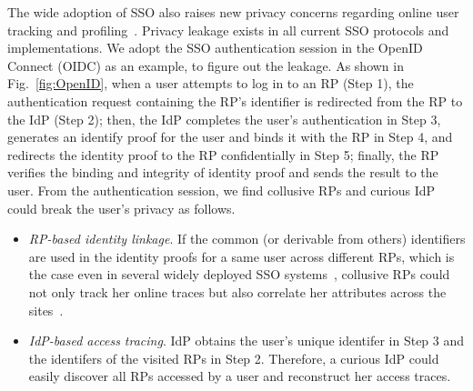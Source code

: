 The wide adoption of SSO also raises new privacy concerns regarding online user tracking and profiling~\cite{maler2008venn,NIST2017draft}.
Privacy leakage exists in all current SSO protocols and implementations.
We adopt the SSO authentication session in the OpenID Connect (OIDC)  as an example, to figure out the leakage. %
As shown in Fig.~\ref{fig:OpenID}, when a user attempts to log in to an RP (Step 1), the authentication request containing the RP's identifier is redirected from the RP to the IdP (Step 2);
then, the IdP completes the user's authentication in Step 3,  generates an identify proof for the user and binds it  with the  RP in Step 4, and redirects the identity proof to the RP confidentially in Step 5;
finally, the RP verifies the binding and integrity of identity proof and sends the result to the user.
From the authentication session, we find  collusive RPs and curious IdP could break the user's privacy  as follows.
\begin{itemize}
  \item {\em RP-based identity linkage}. %
If the common (or derivable from others) identifiers are used in the identity proofs for a same user across different RPs, %
which is the case even in several widely deployed SSO systems~\cite{BrowserID,SPRESSO}, collusive RPs could not only track her online traces but also correlate her attributes across the sites~\cite{maler2008venn}.
  \item {\em IdP-based access tracing}. IdP obtains the user's unique identifer in Step 3 and the identifers of the visited RPs in Step 2.
 Therefore, a curious IdP could easily discover all RPs accessed by a user and reconstruct her access traces. %
\end{itemize}

